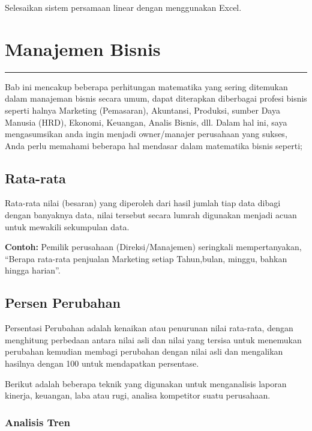 \documentclass[
]{book}
\begin{document}
Selesaikan sistem persamaan linear dengan menggunakan Excel.

\hypertarget{Manajemen-Bisnis}{%
\chapter{Manajemen Bisnis}\label{Manajemen-Bisnis}}

\begin{center}\rule{0.5\linewidth}{0.5pt}\end{center}

Bab ini mencakup beberapa perhitungan matematika yang sering ditemukan dalam manajeman bisnis secara umum, dapat diterapkan diberbagai profesi bisnis seperti halnya Marketing (Pemasaran), Akuntansi, Produksi, sumber Daya Manusia (HRD), Ekonomi, Keuangan, Analis Bisnis, dll. Dalam hal ini, saya mengasumsikan anda ingin menjadi owner/manajer perusahaan yang sukses, Anda perlu memahami beberapa hal mendasar dalam matematika bisnis seperti;

\hypertarget{rata-rata}{%
\section{Rata-rata}\label{rata-rata}}

Rata-rata nilai (besaran) yang diperoleh dari hasil jumlah tiap data dibagi dengan banyaknya data, nilai tersebut secara lumrah digunakan menjadi acuan untuk mewakili sekumpulan data.

\textbf{Contoh:} Pemilik perusahaan (Direksi/Manajemen) seringkali mempertanyakan, ``Berapa rata-rata penjualan Marketing setiap Tahun,bulan, minggu, bahkan hingga harian''.

\hypertarget{persen-perubahan}{%
\section{Persen Perubahan}\label{persen-perubahan}}

Persentasi Perubahan adalah kenaikan atau penurunan nilai rata-rata, dengan menghitung perbedaan antara nilai asli dan nilai yang tersisa untuk menemukan perubahan kemudian membagi perubahan dengan nilai asli dan mengalikan hasilnya dengan 100 untuk mendapatkan persentase.

Berikut adalah beberapa teknik yang digunakan untuk menganalisis laporan kinerja, keuangan, laba atau rugi, analisa kompetitor suatu perusahaan.

\hypertarget{analisis-tren}{%
\subsection{Analisis Tren}\label{analisis-tren}}
\end{document}
